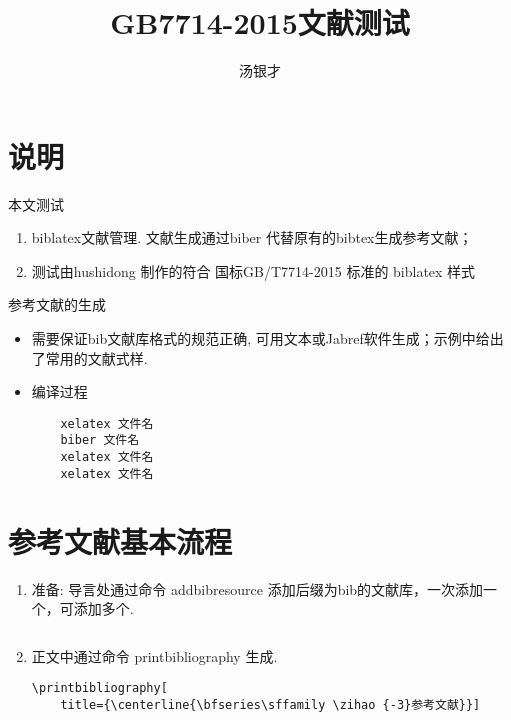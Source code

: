 \documentclass[a4paper,zihao=-4,UTF8,punct,linespread=1.56]{ctexart}
\begin{document}
	
\title{GB7714-2015文献测试}	
\author{汤银才}

\maketitle

\section{说明}

本文测试

\begin{enumerate}
	\item biblatex文献管理. 文献生成通过biber 代替原有的bibtex生成参考文献；
	\item 测试由hushidong 制作的符合 国标GB/T7714-2015 标准的 biblatex 样式
\end{enumerate}

参考文献的生成
\begin{itemize}
	\item 需要保证bib文献库格式的规范正确, 可用文本或Jabref软件生成；示例中给出了常用的文献式样. 	
	\item 编译过程
	\begin{verbatim}
	xelatex 文件名
	biber 文件名
	xelatex 文件名	
	xelatex 文件名
	\end{verbatim}
\end{itemize}


\section{参考文献基本流程}
\begin{enumerate}
\item 准备: 导言处通过命令 addbibresource 添加后缀为bib的文献库，一次添加一个，可添加多个. 

\begin{verbatim}

\end{verbatim}

\item 正文中通过命令 printbibliography 生成.	

\begin{verbatim}
\printbibliography[
    title={\centerline{\bfseries\sffamily \zihao {-3}参考文献}}]
\end{verbatim}

\end{enumerate}
\end{document}
